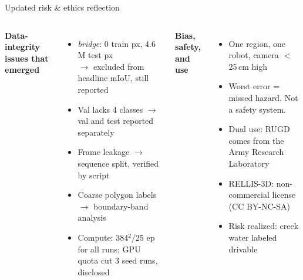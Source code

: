 \documentclass[aspectratio=169,11pt]{beamer}
\newcommand{\cls}[1]{\textit{#1}}
\begin{document}
\begin{frame}{Updated risk \& ethics reflection}
\small
\begin{columns}[T]
\textbf{\color{trail}Data-integrity issues that emerged}
\begin{itemize}\setlength\itemsep{2pt}
  \item \cls{bridge}: 0 train px, 4.6\,M test px\\
        $\to$ excluded from headline mIoU, still reported
  \item Val lacks 4 classes $\to$ val and test reported separately
  \item Frame leakage $\to$ sequence split, verified by script
  \item Coarse polygon labels $\to$ boundary-band analysis
  \item Compute: 384$^2$/25 ep for all runs; GPU quota cut 3 seed runs, disclosed
\end{itemize}
\textbf{\color{trail}Bias, safety, and use}
\begin{itemize}\setlength\itemsep{3pt}
  \item One region, one robot, camera $<$\,25\,cm high
  \item Worst error = missed hazard. \alert{Not a safety system.}
  \item Dual use: RUGD comes from the Army Research Laboratory
  \item RELLIS-3D: non-commercial license (CC BY-NC-SA)
  \item Risk realized: creek water labeled drivable
\end{itemize}
\end{columns}
\end{frame}
\end{document}
